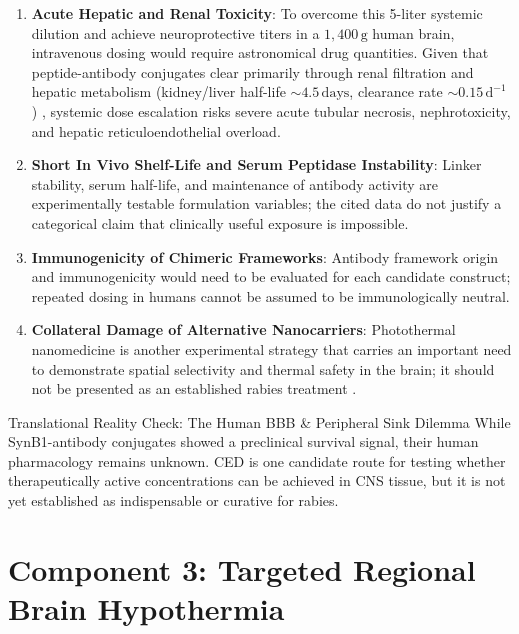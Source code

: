 \documentclass[12pt,a4paper]{article}
\begin{document}
\begin{enumerate}
    \item \textbf{Acute Hepatic and Renal Toxicity}:
    To overcome this 5-liter systemic dilution and achieve neuroprotective titers in a $1{,}400\,\mathrm{g}$ human brain, intravenous dosing would require astronomical drug quantities. Given that peptide-antibody conjugates clear primarily through renal filtration and hepatic metabolism (kidney/liver half-life $\sim 4.5\,\mathrm{days}$, clearance rate $\sim 0.15\,\mathrm{d}^{-1}$) \citep{ren2025synb1}, systemic dose escalation risks severe acute tubular necrosis, nephrotoxicity, and hepatic reticuloendothelial overload.
    
    \item \textbf{Short In Vivo Shelf-Life and Serum Peptidase Instability}:
    Linker stability, serum half-life, and maintenance of antibody activity are experimentally testable formulation variables; the cited data do not justify a categorical claim that clinically useful exposure is impossible.
    
    \item \textbf{Immunogenicity of Chimeric Frameworks}:
    Antibody framework origin and immunogenicity would need to be evaluated for each candidate construct; repeated dosing in humans cannot be assumed to be immunologically neutral.
    
    \item \textbf{Collateral Damage of Alternative Nanocarriers}:
    Photothermal nanomedicine is another experimental strategy that carries an important need to demonstrate spatial selectivity and thermal safety in the brain; it should not be presented as an established rabies treatment \citep{ren2021photothermal}.
\end{enumerate}

\begin{cautionbox}{Translational Reality Check: The Human BBB \& Peripheral Sink Dilemma}
While SynB1-antibody conjugates showed a preclinical survival signal, their human pharmacology remains unknown. CED is one candidate route for testing whether therapeutically active concentrations can be achieved in CNS tissue, but it is not yet established as indispensable or curative for rabies.
\end{cautionbox}

\section{Component 3: Targeted Regional Brain Hypothermia}
\end{document}

